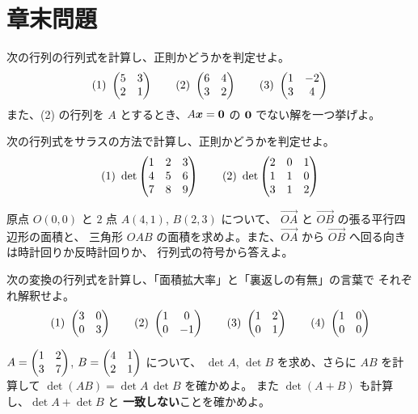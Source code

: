\section*{章末問題}

\begin{mondai}[基本]\label{q:det-ex1}
次の行列の行列式を計算し、正則かどうかを判定せよ。
\[
(1)\ \begin{pmatrix}5 & 3 \\ 2 & 1\end{pmatrix} \qquad
(2)\ \begin{pmatrix}6 & 4 \\ 3 & 2\end{pmatrix} \qquad
(3)\ \begin{pmatrix}1 & -2 \\ 3 & 4\end{pmatrix}
\]
また、(2) の行列を $A$ とするとき、$A\bm{x} = \bm{0}$ の
$\bm{0}$ でない解を一つ挙げよ。
\end{mondai}

\begin{mondai}[基本]\label{q:det-ex2}
次の行列式をサラスの方法で計算し、正則かどうかを判定せよ。
\[
(1)\ \det \begin{pmatrix}1 & 2 & 3 \\ 4 & 5 & 6 \\ 7 & 8 & 9\end{pmatrix} \qquad
(2)\ \det \begin{pmatrix}2 & 0 & 1 \\ 1 & 1 & 0 \\ 3 & 1 & 2\end{pmatrix}
\]
\end{mondai}

\begin{mondai}[基本]\label{q:det-ex3}
原点 $O(0, 0)$ と $2$ 点 $A(4, 1)$, $B(2, 3)$ について、
$\overrightarrow{OA}$ と $\overrightarrow{OB}$ の張る平行四辺形の面積と、
三角形 $OAB$ の面積を求めよ。また、$\overrightarrow{OA}$ から
$\overrightarrow{OB}$ へ回る向きは時計回りか反時計回りか、
行列式の符号から答えよ。
\end{mondai}

\begin{mondai}[基本]\label{q:det-ex4}
次の変換の行列式を計算し、「面積拡大率」と「裏返しの有無」の言葉で
それぞれ解釈せよ。
\[
(1)\ \begin{pmatrix}3 & 0 \\ 0 & 3\end{pmatrix} \qquad
(2)\ \begin{pmatrix}1 & 0 \\ 0 & -1\end{pmatrix} \qquad
(3)\ \begin{pmatrix}1 & 2 \\ 0 & 1\end{pmatrix} \qquad
(4)\ \begin{pmatrix}1 & 0 \\ 0 & 0\end{pmatrix}
\]
\end{mondai}

\begin{mondai}[標準]\label{q:det-ex5}
$A = \begin{pmatrix}1 & 2 \\ 3 & 7\end{pmatrix}$, $B = \begin{pmatrix}4 & 1 \\ 2 & 1\end{pmatrix}$ について、
$\det A$, $\det B$ を求め、さらに $AB$ を計算して
$\det(AB) = \det A \, \det B$ を確かめよ。
また $\det(A + B)$ も計算し、$\det A + \det B$ と
\textbf{一致しない}ことを確かめよ。
\end{mondai}

